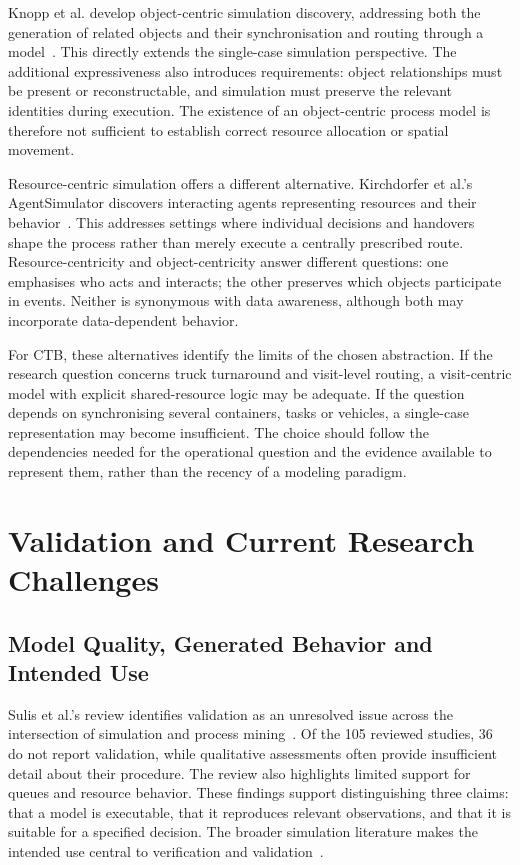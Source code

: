 Knopp et al. develop object-centric simulation discovery, addressing both the generation of related objects and their synchronisation and routing through a model~\cite{Knopp2023ObjectCentricSimulation}. This directly extends the single-case simulation perspective. The additional expressiveness also introduces requirements: object relationships must be present or reconstructable, and simulation must preserve the relevant identities during execution. The existence of an object-centric process model is therefore not sufficient to establish correct resource allocation or spatial movement.

Resource-centric simulation offers a different alternative. Kirchdorfer et al.'s AgentSimulator discovers interacting agents representing resources and their behavior~\cite{RWKirchdorfer2025Agents}. This addresses settings where individual decisions and handovers shape the process rather than merely execute a centrally prescribed route. Resource-centricity and object-centricity answer different questions: one emphasises who acts and interacts; the other preserves which objects participate in events. Neither is synonymous with data awareness, although both may incorporate data-dependent behavior.

For CTB, these alternatives identify the limits of the chosen abstraction. If the research question concerns truck turnaround and visit-level routing, a visit-centric model with explicit shared-resource logic may be adequate. If the question depends on synchronising several containers, tasks or vehicles, a single-case representation may become insufficient. The choice should follow the dependencies needed for the operational question and the evidence available to represent them, rather than the recency of a modeling paradigm.

\section{Validation and Current Research Challenges}
\label{sec:rw_validation}

\subsection{Model Quality, Generated Behavior and Intended Use}

Sulis et al.'s review identifies validation as an unresolved issue across the intersection of simulation and process mining~\cite{Sulis2026SimulationReview}. Of the 105 reviewed studies, 36 do not report validation, while qualitative assessments often provide insufficient detail about their procedure. The review also highlights limited support for queues and resource behavior. These findings support distinguishing three claims: that a model is executable, that it reproduces relevant observations, and that it is suitable for a specified decision. The broader simulation literature makes the intended use central to verification and validation~\cite{Sargent2013Validation,BPSAalst2015}.


